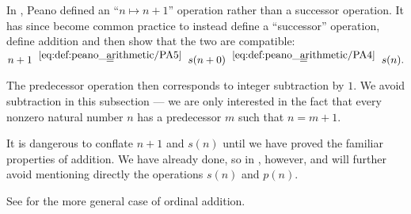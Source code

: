 \begin{remark}\label{rem:natural_number_successor_via_addition}
  In \cite[1]{Peano1889}, Peano defined an \enquote{\( n \mapsto n + 1 \)} operation rather than a successor operation. It has since become common practice to instead define a \enquote{successor} operation, define addition and then show that the two are compatible:
  \begin{equation*}
    n + 1
    \reloset {\eqref{eq:def:peano_arithmetic/PA5}} =
    s(n + 0)
    \reloset {\eqref{eq:def:peano_arithmetic/PA4}} =
    s(n).
  \end{equation*}

  The predecessor operation then corresponds to integer subtraction by \( 1 \). We avoid subtraction in this subsection --- we are only interested in the fact that every nonzero natural number \( n \) has a predecessor \( m \) such that \( n = m + 1 \).

  It is dangerous to conflate \( n + 1 \) and \( s(n) \) until we have proved the familiar properties of addition. We have already done, so in , however, and will further avoid mentioning directly the operations \( s(n) \) and \( p(n) \).

  See  for the more general case of ordinal addition.
\end{remark}

